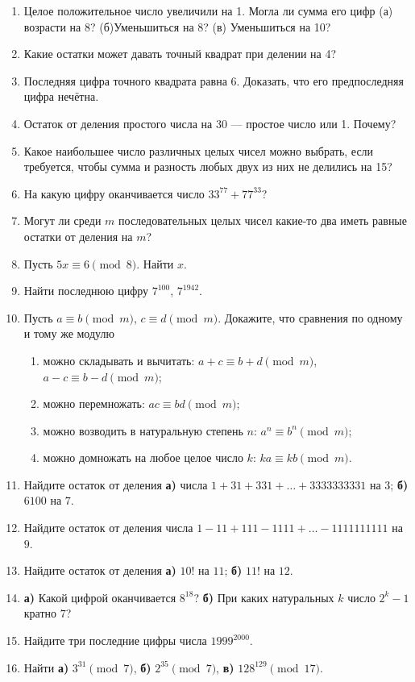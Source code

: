 \begin{enumerate}
\item Целое положительное число увеличили на 1. Могла ли сумма
его цифр (а) возрасти на 8? (б)Уменьшиться на 8? (в) Уменьшиться
на 10?
\item Какие остатки может давать точный квадрат при делении на 4?
\item Последняя цифра точного квадрата равна 6. Доказать, что его
предпоследняя цифра нечётна.
\item Остаток от деления простого числа на 30 --- простое число или 1. Почему?
\item Какое наибольшее число различных целых чисел можно выбрать, если требуется, чтобы сумма и разность любых двух из них не делились на 15?
\item На какую цифру оканчивается число $33^{77}+77^{33}$?
\item Могут ли среди $m$ последовательных целых чисел какие-то два иметь равные остатки от
деления на $m$?
\item Пусть $5x\equiv 6\pmod 8$. Найти $x$.
\item Найти последнюю цифру $7^{100}$, $7^{1942}$.
\item Пусть $a \equiv b \pmod m$, $c \equiv d \pmod m$. Докажите, что сравнения по одному и тому же модулю
\begin{enumerate}
\item можно складывать и вычитать: $a + c \equiv b + d \pmod m$, $a - c \equiv b - d \pmod m$;
\item можно перемножать: $ac \equiv bd \pmod m$;
\item можно возводить в натуральную степень $n$: $a^n \equiv b^n \pmod m$;
\item можно домножать на любое целое число $k$: $ka \equiv kb \pmod m$.
\end{enumerate}
\item Найдите остаток от деления \textbf{а)} числа $1 + 31 + 331 + \dots + 3333333331$ на $3$; \textbf{б)} $6100$ на $7$.
\item Найдите остаток от деления числа $1 - 11 + 111 - 1111 + \dots - 1111111111$ на $9$.
\item Найдите остаток от деления \textbf{а)} $10!$ на $11$; \textbf{б)} $11!$ на $12$.
\item \textbf{а)} Какой цифрой оканчивается $8^{18}$? \textbf{б)} При каких натуральных $k$ число $2^k-1$ кратно $7$?
\item Найдите три последние цифры числа $1999^{2000}$.
\item Найти \textbf{а)} $3^{31}\pmod 7$, \textbf{б)} $2^{35}\pmod 7$, \textbf{в)} $128^{129}\pmod {17}$.

\end{enumerate}
